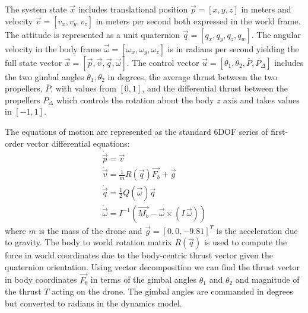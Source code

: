 \documentclass[conf]{new-aiaa}
\newcommand{\pdiff}{P_{\Delta}}
\newcommand{\pavg}{\overline{P}}
\begin{document}
The system state $\vec{x}$ includes translational position $\vec{p} = [x, y,  z]$ in meters and velocity $\vec{v} = [v_x, v_y, v_z ]$ in meters per second both expressed in the world frame. The attitude is represented as a unit quaternion $\vec{q} = [q_x, q_y,  q_z, q_w]$. The angular velocity in the body frame $ \vec{\omega} = [\omega_x, \omega_y, \omega_z]$ is in radians per second yielding the full state vector $\vec{x} = [\vec{p}, \vec{v}, \vec{q},  \vec{\omega} ]$. The control vector $\vec{u} =[ \theta_1, \theta_2, \pavg, \pdiff ]$ includes the two gimbal angles $\theta_1, \theta_2 $ in degrees, the average thrust between the two propellers, $\pavg$, with values from $[0, 1]$, and the differential thrust between the propellers $\pdiff$ which  controls the rotation about the body $z$ axis and takes values in $[-1, 1]$.

The equations of motion are represented as the standard 6DOF series of first-order vector differential equations:
\begin{gather}
	\dot{\vec{p}}  = \vec{v}         \label{eqMotion1}	\\
	\dot{\vec{v}}  = \frac{1}{m}R(\vec{q})\vec{F_b}+\vec{g}  \label{eqMotion2} \\
	\dot{\vec{q}} = \frac{1}{2}Q(\vec{\omega})\vec{q}  \label{eqMotion3} \\
	\dot{\vec{\omega}} = I^{-1}\!\left(\vec{M_b} - \vec{\omega} \times (I\,\vec{\omega})\right) \label{eqMotion4}
\end{gather}
where $m$ is the mass of the drone and $\vec{g} = [0, 0, -9.81]^T$ is the acceleration due to gravity. The body to world rotation matrix $R(\vec{q})$  is used to compute the force in world coordinates due to the body-centric thrust vector given the quaternion orientation. Using vector decomposition we can find the thrust vector in body coordinates $\vec{F_b}$ in terms of the gimbal angles $\theta_1$ and $\theta_2$ and magnitude of the thrust $T$ acting on the drone. The gimbal angles  are commanded in degrees but converted to radians in the dynamics model.
\end{document}
